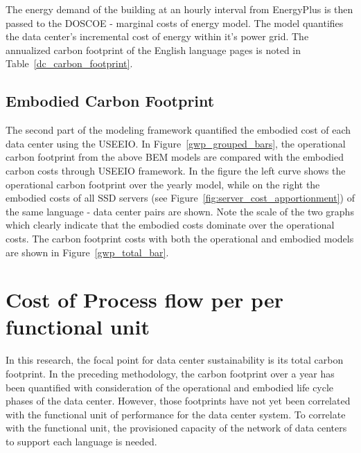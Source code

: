     
    
    The energy demand of the building at an hourly interval from EnergyPlus is then passed to the DOSCOE - marginal costs of energy model. The model quantifies the data center's incremental cost of energy within it's power grid. The annualized carbon footprint of the English language pages is noted in Table~\ref{dc_carbon_footprint}.

    
    
    
    
    
    
    
    \subsection{Embodied Carbon Footprint}
    The second part of the modeling framework quantified the embodied cost of each data center using the USEEIO. In Figure~\ref{gwp_grouped_bars}, the operational carbon footprint from the above BEM models are compared with the embodied carbon costs through USEEIO framework. In the figure the left curve shows the operational carbon footprint over the yearly model, while on the right the embodied costs of all SSD servers (see Figure~\ref{fig:server_cost_apportionment}) of the same language - data center pairs are shown. Note the scale of the two graphs which clearly indicate that the embodied costs dominate over the operational costs. The carbon footprint costs with both the operational and embodied models are shown in Figure~\ref{gwp_total_bar}.
    
    
    

    
    
    
    \section{Cost of Process flow per per functional unit}

    In this research, the focal point for data center sustainability is its total carbon footprint. In the preceding methodology, the carbon footprint over a year has been quantified with consideration of the operational and embodied life cycle phases of the data center. However, those footprints have not yet been correlated with the functional unit of performance for the data center system. To correlate with the functional unit, the provisioned capacity of the network of data centers to support each language is needed. 
    
